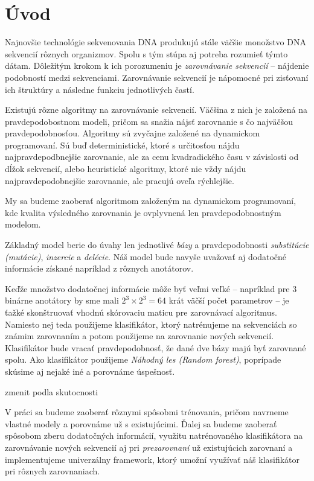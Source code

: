 \chapter*{Úvod}
{}

Najnovšie technológie sekvenovania DNA produkujú stále väčšie monožstvo DNA sekvencií rôznych organizmov. Spolu s tým stúpa aj potreba rozumieť týmto dátam.
Dôležitým krokom k ich porozumeniu je \textit{zarovnávanie sekvencií} -- nájdenie podobností medzi sekvenciami.
Zarovnávanie sekvencií je nápomocné pri zisťovaní ich štruktúry a následne funkciu jednotlivých častí.

Existujú rôzne algoritmy na zarovnávanie sekvencií. Väčšina z nich je založená na  pravdepodobostnom modeli, pričom sa snažia nájsť zarovnanie s čo najväčšou pravdepodobnosťou.
Algoritmy sú zvyčajne založené na dynamickom programovaní. Sú buď deterministické, ktoré s určitosťou nájdu najpravdepodbnejšie zarovnanie, ale za cenu kvadradického času v závislosti od dĺžok sekvencií, alebo heuristické algoritmy, ktoré nie vždy nájdu najpravdepodobnejšie zarovnanie, ale pracujú oveľa rýchlejšie.

My sa budeme zaoberať algoritmom založeným na dynamickom programovaní, kde kvalita výsledného zarovnania je ovplyvnená len pravdepodobnostným modelom.

Základný model berie do úvahy len jednotlivé \textit{bázy} a pravdepodobnosti \textit{substitúcie (mutácie)}, \textit{inzercie} a \textit{delécie}.
Náš model bude navyše uvažovať aj dodatočné informácie získané napríklad z rôznych anotátorov.

Keďže množstvo dodatočnej informácie môže byť veľmi veľké -- napríklad pre 3 binárne anotátory by sme mali $2^3 \times 2^3 = 64$ krát väčší počet parametrov --
je ťažké skonštruovať vhodnú skórovaciu maticu pre zarovnávací algoritmus.
Namiesto nej teda použijeme klasifikátor, ktorý natrénujeme na sekvenciách so známim zarovnaním a potom použijeme na zarovnanie nových sekvencií. Klasifikátor bude vracať pravdepodobnosť, že dané dve bázy majú byť zarovnané spolu.
Ako klasifikátor použijeme \textit{Náhodný les (Random forest)}, poprípade skúsime aj nejaké iné a porovnáme úspešnosť.

\todo zmenit podla skutocnosti

V práci sa budeme zaoberať rôznymi spôsobmi trénovania, pričom navrneme vlastné modely a porovnáme už s existujúcimi. Ďalej sa budeme zaoberať spôsobom zberu dodatočných informácií, využitu natrénovaného klasifikátora na zarovnávanie nových sekvencií aj pri \textit{prezarovnaní} už existujúcich zarovnaní a implementujeme univerzálny framework, ktorý umožní využívať náš klasifikátor pri rôznych zarovnaniach.


